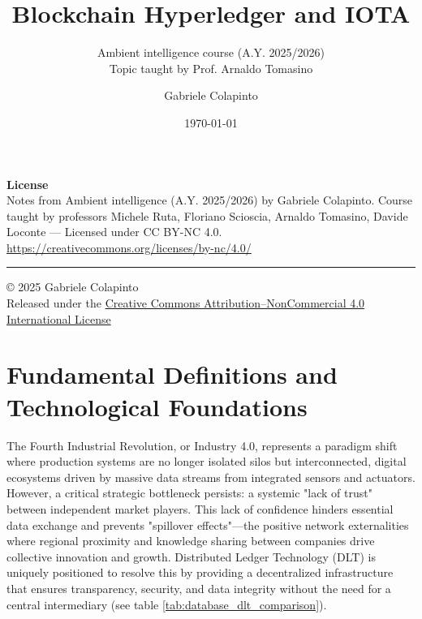 \documentclass{scrbook}
\title{Blockchain Hyperledger and IOTA}
\subtitle{Ambient intelligence course (A.Y. 2025/2026)\\Topic taught by Prof. Arnaldo Tomasino}
\author{Gabriele Colapinto}
\date{\today}
\begin{document}
\maketitle
\thispagestyle{empty}

{\Large\textbf{License}} \\
{Notes from Ambient intelligence (A.Y. 2025/2026) by Gabriele Colapinto. 
Course taught by professors Michele Ruta, Floriano Scioscia, Arnaldo Tomasino, Davide Loconte — 
Licensed under CC BY-NC 4.0.\\
\url{https://creativecommons.org/licenses/by-nc/4.0/}}

\vspace*{\fill}
\rule{\textwidth}{0.2pt}
\small{© 2025 Gabriele Colapinto \\
Released under the \href{https://creativecommons.org/licenses/by-nc/4.0/}{Creative Commons Attribution–NonCommercial 4.0 International License}}

\clearpage

\tableofcontents

\chapter{Fundamental Definitions and Technological Foundations}

The Fourth Industrial Revolution, or Industry 4.0, represents a paradigm shift where production systems are no longer isolated silos but interconnected, digital ecosystems driven by massive data streams from integrated sensors and actuators. However, a critical strategic bottleneck persists: a systemic "lack of trust" between independent market players. This lack of confidence hinders essential data exchange and prevents "spillover effects"—the positive network externalities where regional proximity and knowledge sharing between companies drive collective innovation and growth. Distributed Ledger Technology (DLT) is uniquely positioned to resolve this by providing a decentralized infrastructure that ensures transparency, security, and data integrity without the need for a central intermediary (see table \ref{tab:database_dlt_comparison}).\\
\end{document}
